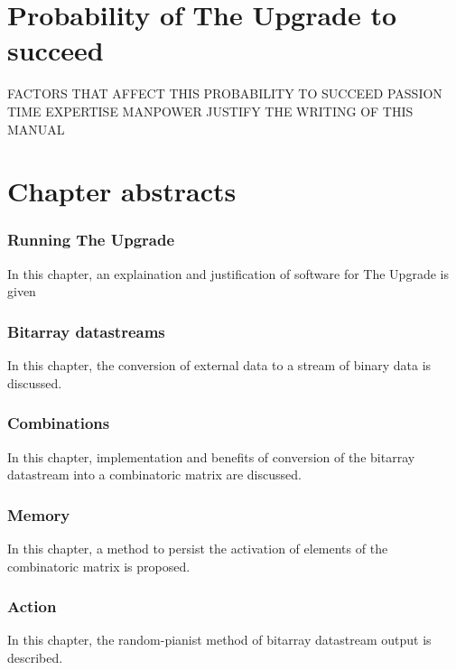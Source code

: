 \section{Probability of The Upgrade to succeed}
FACTORS THAT AFFECT THIS PROBABILITY TO SUCCEED
PASSION
TIME
EXPERTISE
MANPOWER
JUSTIFY THE WRITING OF THIS MANUAL 
\section{Chapter abstracts}
\subsubsection{Running The Upgrade}
In this chapter, an explaination and justification of software for The Upgrade is given
\subsubsection{Bitarray datastreams}
In this chapter, the conversion of external data to a stream of binary data is discussed.
\subsubsection{Combinations}
In this chapter, implementation and benefits of conversion of the bitarray datastream into a combinatoric matrix are discussed.
\subsubsection{Memory}
In this chapter, a method to persist the activation of  elements of the combinatoric matrix is proposed.
\subsubsection{Action}
In this chapter, the random-pianist method of bitarray datastream output is described.
